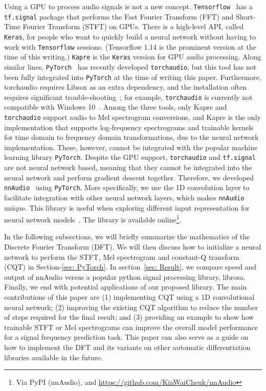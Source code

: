 \documentclass{ieeeaccess}
\newcommand{\nbh}[1]{\texttt{#1}}
\begin{document}
Using a GPU to process audio signals is not a new concept. \nbh{Tensorflow}~\cite{Tensorflow2015-whitepaper} has a \nbh{tf.signal} package that performs the Fast Fourier Transform (FFT) and Short-Time Fourier Transform (STFT) on GPUs. There is a high-level API, called \nbh{Keras}, for people who want to quickly build a neural network without having to work with \nbh{Tensorflow} sessions. (Tensorflow 1.14 is the prominent version at the time of this writing.) \nbh{Kapre} \cite{choi2017kapre} is the \nbh{Keras} version for GPU audio processing. Along similar lines, \nbh{PyTorch}~\cite{paszke2017automatic} has recently developed \nbh{torchaudio}, but this tool has not been fully integrated into \nbh{PyTorch} at the time of writing this paper. Furthermore, torchaudio requires Libsox as an extra dependency, and the installation often requires significant trouble-shooting~\cite{torchaudio_mac}; for example, \nbh{torchaudio} is currently not compatible with Windows 10~\cite{torchaudio_win}. Among the three tools, only Kapre and \nbh{torchaudio} support audio to Mel spectrogram conversions, and Kapre is the only implementation that supports log-frequency spectrograms and trainable kernels for time domain to frequency domain transformations, due to the neural network implementation. These, however, cannot be integrated with the popular machine learning library \nbh{PyTorch}. Despite the GPU support, \nbh{torchaudio} and \nbh{tf.signal} are not neural network based, meaning that they cannot be integrated into the neural network and perform gradient descent together. Therefore, we developed \nbh{nnAudio}~\cite{nnAudio} using \nbh{PyTorch}. More specifically, we use the 1D convolution layer to facilitate integration with other neural network layers, which makes \nbh{nnAudio} unique. This library is useful when exploring different input representation for neural network models~\cite{balamurali2019toward,kelz2016potential}.
The library is available online\footnote{\label{nnAudio} Via PyPI (nnAudio), and \url{https://github.com/KinWaiCheuk/nnAudio}}.

In the following subsections, we will briefly summarize the mathematics of the Discrete Fourier Transform (DFT). We will then discuss how to initialize a neural network to perform the STFT, Mel spectrogram and constant-Q transform (CQT) in Section-\ref{sec: PyTorch}. In section~\ref{sec: Result}, we compare speed and output of nnAudio versus a popular python signal processing library, librosa. Finally, we end with potential applications of our proposed library. 
The main contributions of this paper are (1) implementing CQT using a 1D convolutional neural network; (2) improving the existing CQT algorithm to reduce the number of steps required for the final result; and (3) providing an example to show how trainable STFT or Mel spectrograms can improve the overall model performance for a signal frequency prediction task. This paper can also serve as a guide on how to implement the DFT and its variants on other automatic differentiation libraries available in the future.    
\end{document}
